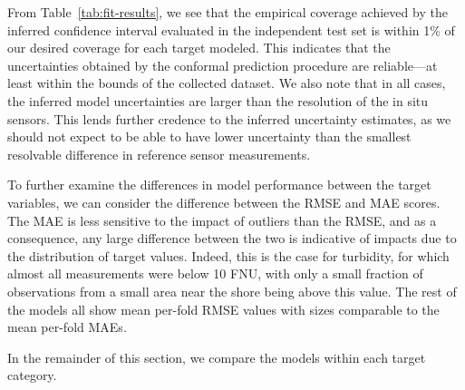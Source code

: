 \clearpage
\newpage



From Table~\ref{tab:fit-results},  we see that the empirical coverage achieved by the inferred confidence interval evaluated in the independent test set is within 1\% of our desired coverage for each target modeled. This indicates that the uncertainties obtained by the conformal prediction procedure are reliable---at least within the bounds of the collected dataset. We also note that in all cases, the inferred model uncertainties are larger than the resolution of the in situ sensors. This lends further credence to the inferred uncertainty estimates, as we should not expect to be able to have lower uncertainty than the smallest resolvable difference in reference sensor measurements.

To further examine the differences in model performance between the target variables, we can consider the difference between the RMSE and MAE scores. The MAE is less sensitive to the impact of outliers than the RMSE, and as a consequence, any large difference between the two is indicative of impacts due to the distribution of target values. Indeed, this is the case for turbidity, for which almost all measurements were below 10 FNU, with only a small fraction of observations from a small area near the shore being above this value. %
The rest of the models all show mean per-fold RMSE values with sizes comparable to the mean per-fold MAEs. 

In the remainder of this section, we compare the models within each target category.

\clearpage
\newpage

